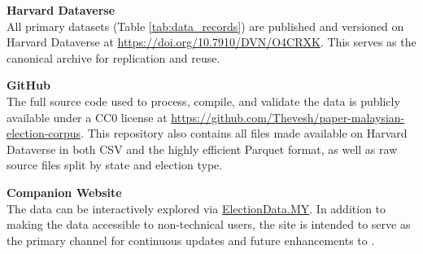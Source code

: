 \documentclass[11pt]{article}
\begin{document}
\begin{enumbul}
\item \textbf{Harvard Dataverse}\\
All primary datasets (Table \ref{tab:data_records}) are published and versioned on Harvard Dataverse at \url{https://doi.org/10.7910/DVN/O4CRXK}. This serves as the canonical archive for replication and reuse.

\item \textbf{GitHub}\\
The full source code used to process, compile, and validate the data is publicly available under a CC0 license at \url{https://github.com/Thevesh/paper-malaysian-election-corpus}. This repository also contains all files made available on Harvard Dataverse in both CSV and the highly efficient Parquet format, as well as raw source files split by state and election type.

\item \textbf{Companion Website}\\
The data can be interactively explored via \href{https://electiondata.my}{ElectionData.MY}. In addition to making the data accessible to non-technical users, the site is intended to serve as the primary channel for continuous updates and future enhancements to \acronymend.
\end{enumbul}
\end{document}
